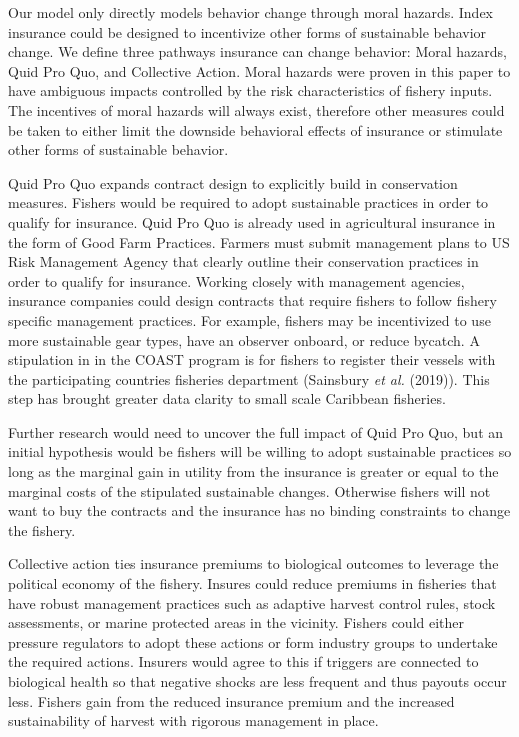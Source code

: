 \documentclass[
  letterpaper,
  DIV=11,
  numbers=noendperiod]{scrartcl}
\theoremstyle{plain}
\theoremstyle{plain}
\theoremstyle{remark}
\begin{document}
Our model only directly models behavior change through moral hazards.
Index insurance could be designed to incentivize other forms of
sustainable behavior change. We define three pathways insurance can
change behavior: Moral hazards, Quid Pro Quo, and Collective Action.
Moral hazards were proven in this paper to have ambiguous impacts
controlled by the risk characteristics of fishery inputs. The incentives
of moral hazards will always exist, therefore other measures could be
taken to either limit the downside behavioral effects of insurance or
stimulate other forms of sustainable behavior.

Quid Pro Quo expands contract design to explicitly build in conservation
measures. Fishers would be required to adopt sustainable practices in
order to qualify for insurance. Quid Pro Quo is already used in
agricultural insurance in the form of Good Farm Practices. Farmers must
submit management plans to US Risk Management Agency that clearly
outline their conservation practices in order to qualify for insurance.
Working closely with management agencies, insurance companies could
design contracts that require fishers to follow fishery specific
management practices. For example, fishers may be incentivized to use
more sustainable gear types, have an observer onboard, or reduce
bycatch. A stipulation in in the COAST program is for fishers to
register their vessels with the participating countries fisheries
department (Sainsbury \emph{et al.} (2019)). This step has brought
greater data clarity to small scale Caribbean fisheries.

Further research would need to uncover the full impact of Quid Pro Quo,
but an initial hypothesis would be fishers will be willing to adopt
sustainable practices so long as the marginal gain in utility from the
insurance is greater or equal to the marginal costs of the stipulated
sustainable changes. Otherwise fishers will not want to buy the
contracts and the insurance has no binding constraints to change the
fishery.

Collective action ties insurance premiums to biological outcomes to
leverage the political economy of the fishery. Insures could reduce
premiums in fisheries that have robust management practices such as
adaptive harvest control rules, stock assessments, or marine protected
areas in the vicinity. Fishers could either pressure regulators to adopt
these actions or form industry groups to undertake the required actions.
Insurers would agree to this if triggers are connected to biological
health so that negative shocks are less frequent and thus payouts occur
less. Fishers gain from the reduced insurance premium and the increased
sustainability of harvest with rigorous management in place.
\end{document}
